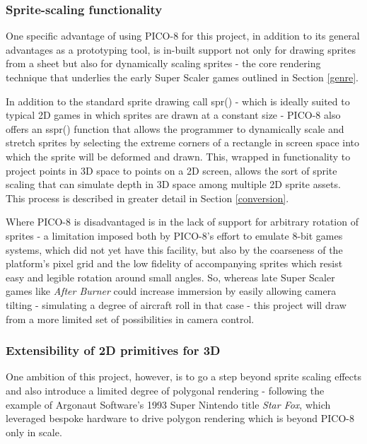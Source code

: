 \documentclass[11pt]{article}
\begin{document}
\subsubsection*{Sprite-scaling functionality}
One specific advantage of using PICO-8 for this project, in addition to its general
advantages as a prototyping tool, is in-built support not only for drawing sprites
from a sheet but also for dynamically scaling sprites - the core rendering technique
that underlies the early Super Scaler games outlined in Section \ref{genre}.

In addition to the standard sprite drawing call spr() - which is ideally suited to
typical 2D games in which sprites are drawn at a constant size - PICO-8 also offers
an sspr() function that allows the programmer to dynamically scale and stretch sprites
by selecting the extreme corners of a rectangle in screen space into which the sprite
will be deformed and drawn. This, wrapped in functionality to project points in 3D space
to points on a 2D screen, allows the sort of sprite scaling that can simulate depth in 3D
space among multiple 2D sprite assets. This process is described in greater detail in
Section \ref{conversion}.

Where PICO-8 is disadvantaged is in the lack of support for arbitrary rotation of sprites -
a limitation imposed both by PICO-8's effort to emulate 8-bit games systems, which did not yet
have this facility, but also by the coarseness of the platform's pixel grid and the low fidelity
of accompanying sprites which resist easy and legible rotation around small angles. So, whereas late
Super Scaler games like \textit{After Burner} could increase immersion by easily allowing
camera tilting - simulating a degree of aircraft roll in that case - this project will
draw from a more limited set of possibilities in camera control.

\subsubsection*{Extensibility of 2D primitives for 3D}
One ambition of this project, however, is to go a step beyond sprite scaling effects
and also introduce a limited degree of polygonal rendering - following the example of
Argonaut Software's 1993 Super Nintendo title \textit{Star Fox}, which leveraged bespoke
hardware to drive polygon rendering which is beyond PICO-8 only in scale.
\end{document}
